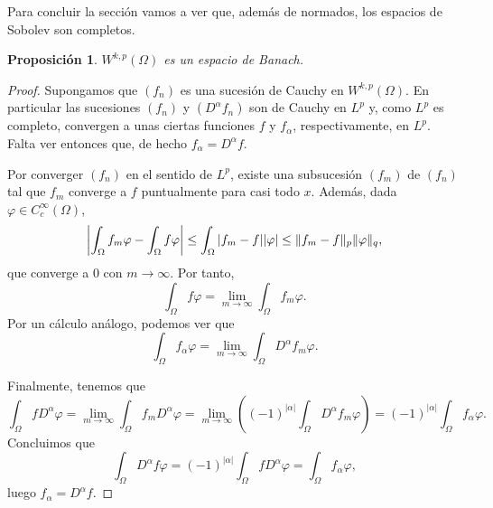\documentclass[12pt,a4paper]{book}
\DeclarePairedDelimiter\norm{\lVert}{\rVert}
\newtheorem{prop}[thm]{Proposición}
\theoremstyle{definition} \newtheorem{defn}[thm]{Definición}
\theoremstyle{definition} \newtheorem{ejemplo}[thm]{Ejemplo}
\theoremstyle{definition} \newtheorem{ejercicio}[thm]{Ejercicio}
\theoremstyle{remark} \newtheorem*{obs}{Observación}
\begin{document}
  Para concluir la sección vamos a ver que, además de normados, los espacios de Sobolev son completos.
  \begin{prop}
    $W^{k,p}(\Omega)$ es un espacio de Banach.
  \end{prop}
  \begin{proof}
    Supongamos que $(f_n)$ es una sucesión de Cauchy en $W^{k,p}(\Omega)$. En particular las sucesiones $(f_n)$ y $(D^\alpha f_n)$ son de Cauchy en $L^p$ y, como $L^p$ es completo, convergen a unas ciertas funciones $f$ y $f_\alpha$, respectivamente, en $L^p$. Falta ver entonces que, de hecho $f_\alpha=D^{\alpha} f$.

    Por converger $(f_n)$ en el sentido de $L^p$, existe una subsucesión $(f_m)$ de $(f_n)$ tal que $f_m$ converge a $f$ puntualmente para casi todo $x$. Además, dada $\varphi\in C^\infty_c (\Omega)$,
    \begin{equation*}
      \left| \int_\Omega f_m \varphi  - \int_\Omega f \varphi \right| \leq \int_\Omega |f_m-f||\varphi| \leq \norm{f_m-f}_p \norm{\varphi}_q,
    \end{equation*}
    que converge a $0$ con $m\rightarrow \infty$. Por tanto,
    \begin{equation*}
    \int_{\Omega} f \varphi = \lim_{m\rightarrow \infty} \int_\Omega f_m \varphi.
  \end{equation*}
  Por un cálculo análogo, podemos ver que
  \begin{equation*}
    \int_{\Omega} f_\alpha \varphi = \lim_{m\rightarrow \infty} \int_\Omega D^\alpha f_m \varphi.
  \end{equation*}
  
  Finalmente, tenemos que
  \begin{equation*}
    \int_\Omega f D^{\alpha} \varphi = \lim_{m\rightarrow \infty} \int_\Omega f_m D^{\alpha}\varphi = \lim_{m\rightarrow \infty} \left( (-1)^{|\alpha|} \int_\Omega D^\alpha f_m \varphi \right)= (-1)^{|\alpha|}\int_{\Omega} f_\alpha \varphi.
  \end{equation*}
  Concluimos que
  \begin{equation*}
    \int_\Omega D^\alpha f \varphi = (-1)^{|\alpha|} \int_{\Omega} f D^\alpha \varphi = \int_\Omega f_\alpha \varphi,
  \end{equation*}
  luego $f_\alpha = D^\alpha f$.
  \end{proof}
\end{document}

